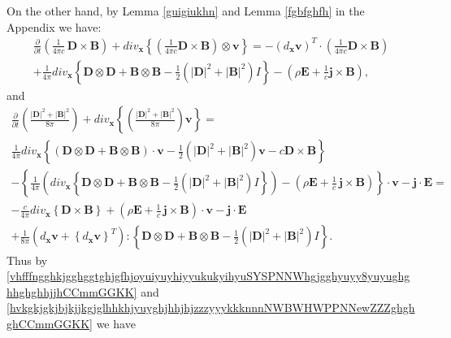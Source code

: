 \documentclass{article}
\theoremstyle{definition}
\theoremstyle{remark}
\renewcommand{\vec}[1]{\mathbf{#1}}
\newcommand{\er}{\eqref}
\newcommand{\er}{\eqref}
\begin{document}
On the other hand, by Lemma \ref{guigiukhn} and Lemma \ref{fgbfghfh}
in the Appendix we have:
\begin{multline}\label{hvkgkjgkjbjkjjkgjglhhkhjyuyghjhhjhjzzzyyykkknnnNWBWHWPPNNewZZZghghghCCmmGGKK}
\frac{\partial}{\partial t}\left(\frac{1}{4\pi c}\,\vec D\times \vec
B\right)+div_\vec x\left\{\left(\frac{1}{4\pi c}\vec D\times \vec
B\right)\otimes \vec v\right\}=-(d_\vec x \vec
v)^T\cdot\left(\frac{1}{4\pi c}\vec D\times \vec
B\right)\\+\frac{1}{4\pi}div_\vec x\left\{\vec D\otimes \vec D+\vec
B\otimes \vec B-\frac{1}{2}\left(|\vec D|^2+|\vec
B|^2\right)I\right\}-\left(\rho \vec E+\frac{1}{c}\vec j\times \vec
B\right),
\end{multline}
and
\begin{multline}\label{hvkgkjgkjbjbbklnknhihiokhhfjffghvjmbjhjkhlkzzzyyykkknnnNWBWHWPPNNewZZZgghghCCmmGGKK}
\frac{\partial}{\partial t}\left(\frac{|\vec D|^2+|\vec
B|^2}{8\pi}\right)+div_\vec x\left\{\left(\frac{|\vec D|^2+|\vec
B|^2}{8\pi}\right)\vec v\right\}=\\
\frac{1}{4\pi}div_\vec x\left\{(\vec D\otimes \vec D+ \vec B\otimes
\vec B)\cdot \vec v-\frac{1}{2}\left(|\vec D|^2+|\vec
B|^2\right)\vec v-c \vec D\times \vec B\right\}
\\-\left\{\frac{1}{4\pi}\left(div_\vec x\left\{\vec D\otimes \vec D+\vec B\otimes
\vec B-\frac{1}{2}\left(|\vec D|^2+|\vec
B|^2\right)I\right\}\right)-\left(\rho \vec E+\frac{1}{c}\,\vec
j\times \vec B\right)\right\}\cdot \vec v-\vec j\cdot \vec E =\\
-\frac{c}{4\pi}div_\vec x\left\{ \vec D\times \vec
B\right\}+\left(\rho \vec E+\frac{1}{c}\,\vec j\times \vec
B\right)\cdot \vec v-\vec j\cdot \vec E
\\+\frac{1}{8\pi}\left(d_{\vec x}\vec v+\left\{d_{\vec x}\vec
v\right\}^T\right):\left\{\vec D\otimes \vec D+\vec B\otimes \vec
B-\frac{1}{2}\left(|\vec D|^2+|\vec B|^2\right)I\right\}.
\end{multline}
Thus by
\er{vhfffngghkjgghggtghjgfhjoyuiyuyhiyyukukyihyuSYSPNNWhgjgghyuyy8yuyughghhghghhjjhCCmmGGKK}
and
\er{hvkgkjgkjbjkjjkgjglhhkhjyuyghjhhjhjzzzyyykkknnnNWBWHWPPNNewZZZghghghCCmmGGKK}
we have
\end{document}
